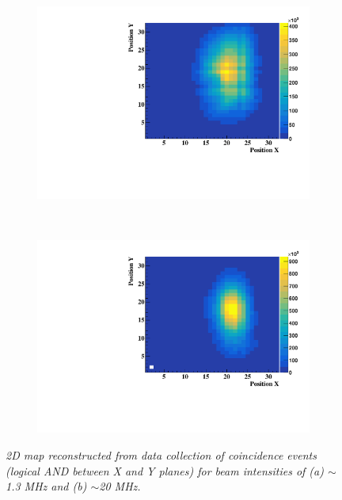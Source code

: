 \documentclass[a4paper,11pt]{article}
\begin{document}
\begin{figure}[htb]
\centering
    \begin{subfigure}{0.45\textwidth} \centering \includegraphics[width=\textwidth]{figures/2D_Map_1MHz.pdf} \caption{} \label{fig:2D_1MHz}
    \end{subfigure}
    ~
    \begin{subfigure}{0.45\textwidth} \centering \includegraphics[width=\textwidth]{figures/2D_Map_20MHz.pdf} \caption{} \label{fig:2D_20MHz}
    \end{subfigure}
\caption{\small{\textit{2D map reconstructed from data collection of coincidence events (logical AND between X and Y planes) for beam intensities of (a) $\sim$1.3 MHz and (b) $\sim$20 MHz.}}}
\label{fig:2D_Maps}
\end{figure}
\end{document}
